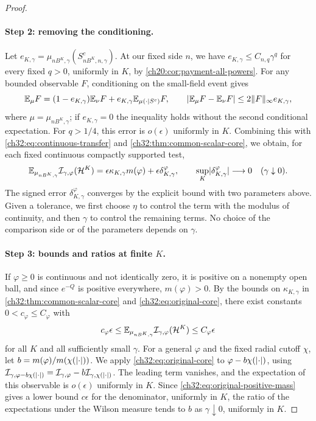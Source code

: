 \begin{proof}
\paragraph{Step 2: removing the conditioning.}
Let $e_{K,\gamma}=\mu_{nB^K,\gamma}(S^c_{nB^K,n,\gamma})$. At our fixed side $n$, we have $e_{K,\gamma}\le C_{n,q}\gamma^q$ for every fixed $q>0$, uniformly in $K$, by \cref{ch20:cor:payment-all-powers}. For any bounded observable $F$, conditioning on the small-field event gives
\[
 \mathbb E_\mu F=(1-e_{K,\gamma})\mathbb E_\nu F+e_{K,\gamma}\mathbb E_{\mu(\cdot\mid S^c)}F,\qquad\lvert \mathbb E_\mu F-\mathbb E_\nu F\rvert\le2\lVert F\rVert_\infty e_{K,\gamma},
\]
where $\mu=\mu_{nB^K,\gamma}$; if $e_{K,\gamma}=0$ the inequality holds without the second conditional expectation. For $q>1/4$, this error is $o(\epsilon)$ uniformly in $K$. Combining this with \eqref{ch32:eq:continuous-transfer} and \cref{ch32:thm:common-scalar-core}, we obtain, for each fixed continuous compactly supported test,
\begin{equation}\label{ch32:eq:original-core}
 \mathbb E_{\mu_{nB^K,\gamma}}\mathcal I_{\gamma,\varphi}(\mathcal H^K)=\epsilon\kappa_{K,\gamma}m(\varphi)+\epsilon\delta^\varphi_{K,\gamma},\qquad\sup_K\lvert \delta^\varphi_{K,\gamma}\rvert\longrightarrow0\quad(\gamma\downarrow0).
\end{equation}
The signed error $\delta^\varphi_{K,\gamma}$ converges by the explicit bound with two parameters above. Given a tolerance, we first choose $\eta$ to control the term with the modulus of continuity, and then $\gamma$ to control the remaining terms. No choice of the comparison side or of the parameters depends on $\gamma$.

\paragraph{Step 3: bounds and ratios at finite $K$.}
If $\varphi\ge0$ is continuous and not identically zero, it is positive on a nonempty open ball, and since $e^{-Q}$ is positive everywhere, $m(\varphi)>0$. By the bounds on $\kappa_{K,\gamma}$ in \cref{ch32:thm:common-scalar-core} and \eqref{ch32:eq:original-core}, there exist constants $0<c_\varphi\le C_\varphi$ with
\begin{equation}\label{ch32:eq:original-positive-mass}
 c_\varphi\epsilon\le\mathbb E_{\mu_{nB^K,\gamma}}\mathcal I_{\gamma,\varphi}(\mathcal H^K)\le C_\varphi\epsilon
\end{equation}
for all $K$ and all sufficiently small $\gamma$. For a general $\varphi$ and the fixed radial cutoff $\chi$, let $b=m(\varphi)/m(\chi(\lvert \cdot\rvert))$. We apply \eqref{ch32:eq:original-core} to $\varphi-b\chi(\lvert \cdot\rvert)$, using $\mathcal I_{\gamma,\varphi-b\chi(\lvert \cdot\rvert)}=\mathcal I_{\gamma,\varphi}-b\mathcal I_{\gamma,\chi(\lvert \cdot\rvert)}$. The leading term vanishes, and the expectation of this observable is $o(\epsilon)$ uniformly in $K$. Since \eqref{ch32:eq:original-positive-mass} gives a lower bound $c\epsilon$ for the denominator, uniformly in $K$, the ratio of the expectations under the Wilson measure tends to $b$ as $\gamma\downarrow0$, uniformly in $K$.


\end{proof}
